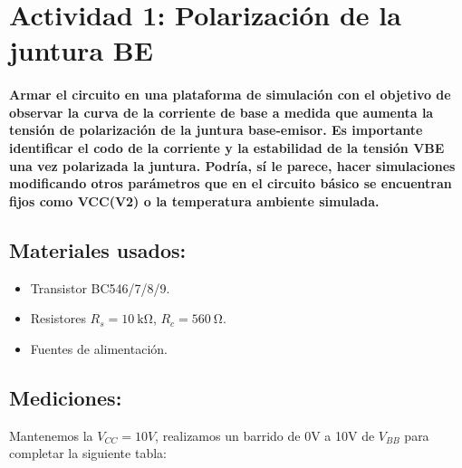 \section{Actividad 1: Polarización de la juntura BE}

\paragraph{Armar el circuito en una plataforma de simulación con el objetivo de observar la curva de la corriente de base a medida que aumenta la tensión de polarización de la juntura base-emisor. Es importante identificar el codo de la corriente y la estabilidad de la tensión VBE una vez polarizada la juntura. Podría, sí le parece, hacer simulaciones modificando otros parámetros que en el circuito básico se encuentran fijos como VCC(V2) o la temperatura ambiente simulada.}



\subsection{Materiales usados:}
\begin{itemize}
    \item Transistor BC546/7/8/9.
    \item Resistores $R_s = \SI{10}{\kilo\ohm}$, $R_c = \SI{560}{\ohm}$.
    \item Fuentes de alimentación.
\end{itemize}


\subsection{Mediciones:}
Mantenemos la $V_{CC} = 10V$, realizamos un barrido de 0V a 10V de $V_{BB}$ para completar la siguiente tabla:

\begin{table}[H]
    \centering
    \caption{Tabla 1}
    \label{tab:mediciones}
\end{table}

